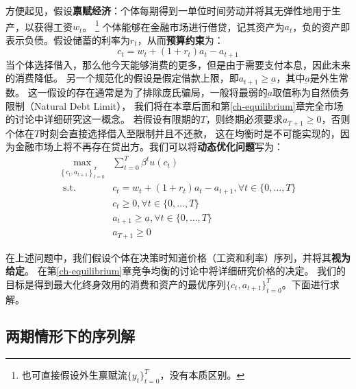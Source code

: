 方便起见，假设\textbf{禀赋经济}：个体每期得到一单位时间劳动并将其无弹性地用于生产，以获得工资$w_t$。
\footnote{也可直接假设外生禀赋流$\{y_t\}_{t=0}^T$，没有本质区别。}
个体能够在金融市场进行借贷，记其资产为$a_t$，负的资产即表示负债。假设储蓄的利率为$r_t$，从而\textbf{预算约束}为：
\begin{equation*}
    c_t = w_t + (1+r_t)a_t - a_{t+1}
\end{equation*}
当个体选择借入，那么他今天能够消费的更多，但是由于需要支付本息，因此未来的消费降低。
另一个规范化的假设是假定借款上限，即$a_{t+1}\geq \underbar{a}$，其中$\underbar{a}$是外生常数。
这一假设的存在通常是为了排除庞氏骗局，一般将最弱的$\underbar{a}$取值称为自然债务限制（Natural Debt Limit），
我们将在本章后面和第\ref{ch-equilibrium}章完全市场的讨论中详细研究这一概念。
若假设有限期的$T$，则终期必须要求$a_{T+1}\geq 0$，否则个体在$T$时刻会直接选择借入至限制并且不还款，
这在均衡时是不可能实现的，因为金融市场上将不再存在贷出方。我们可以将\textbf{动态优化问题}写为：
\begin{equation}
    \begin{aligned}
        \max _{\left\{c_t, a_{t+1}\right\}_{t=0}^T} & \sum_{t=0}^T \beta^t u\left(c_t\right) \\
        \text { s.t. } & c_t=w_t+\left(1+r_t\right) a_t-a_{t+1}, \forall t \in\{0, \ldots, T\} \\
        & c_t \geq 0, \forall t \in\{0, \ldots, T\} \\
        & a_{t+1} \geq \underline{a}, \forall t \in\{0, \ldots, T\} \\
        & a_{T+1} \geq 0
    \end{aligned}
    \tag{P1} \label{problem-cs-finite}
\end{equation}

在上述问题中，我们假设个体在决策时知道价格（工资和利率）序列，并将其\textbf{视为给定}。
在第\ref{ch-equilibrium}章竞争均衡的讨论中将详细研究价格的决定。
我们的目标是得到最大化终身效用的消费和资产的最优序列$\{c_t,a_{t+1}\}_{t=0}^T$。下面进行求解。


\subsection{两期情形下的序列解}

